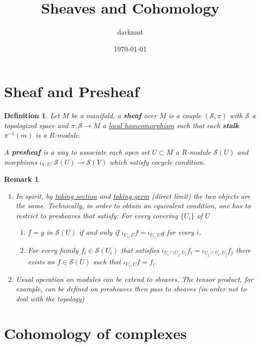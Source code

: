 \documentclass[11pt]{article}
\author{darknmt}
\date{\today}
\title{Sheaves and Cohomology}
\newtheorem{remark}{Remark}
\newtheorem{definition}{Definition}
\begin{document}
\maketitle
\tableofcontents



\section{Sheaf and Presheaf}
\label{sec:orgb21ab35}
\begin{definition}
Let \(M\) be a manifold, a \textbf{sheaf} over \(M\) is a couple \((\mathcal{S}, \pi)\) with \(\mathcal{S}\) a topologized space and \(\pi: \mathcal{S}\longrightarrow M\) a \uline{local
homeomorphism} such that each \textbf{stalk} \(\pi^{-1}(m)\) is a \(R\)-module.

A \textbf{presheaf} is a way to associate each open set \(U\subset M\) a \(R\)-module \(\mathcal{S}(U)\) and morphisms \(\iota_{V,U}: \mathcal{S}(U) \longrightarrow
\mathcal{S}(V)\) which satisfy cocycle condition.
\end{definition}

\begin{remark}
\begin{enumerate}
\item In spirit, by \uline{taking section} and \uline{taking germ} (direct limit) the two objects are the
same. Technically, in order to obtain an equivalent condition, one has to restrict to
presheaves that satisfy: For every covering \(\{U_i\}\) of \(U\)
\begin{enumerate}
\item \(f=g\) in \(\mathcal{S}(U)\) if and only if \(\iota_{U_i, U} f = \iota_{U_i, U} g\) for every \(i\).
\item For every family \(f_i \in \mathcal{S}(U_i)\) that satisfies \(\iota_{U_i\cap
      U_j, U_i}f_i = \iota_{U_j\cap U_i, U_j}f_j\) there exists an \(f \in
      \mathcal{S}(U)\) such that \(\iota_{U_i,U} f = f_i\).
\end{enumerate}
\item Usual operation on modules can be extend to sheaves. The tensor product, for example,
can be defined on presheaves then pass to sheaves (in order not to deal with the
topology)
\end{enumerate}
\end{remark}

\section{Cohomology of complexes}
\label{sec:org3a8407f}
\end{document}
